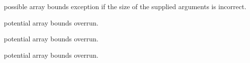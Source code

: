 
\begin{DoxyRefList}
\item[\label{bug__bug000001}%
\hypertarget{bug__bug000001}{}%
Global \hyperlink{group__api_gaf04b41252ebd1a3013b6bcb4dbbf3649}{Line\-Picking\-All\-Problems} (char $\ast$$\ast$, char $\ast$$\ast$)]possible array bounds exception if the size of the supplied arguments is incorrect.  
\item[\label{bug__bug000004}%
\hypertarget{bug__bug000004}{}%
Global \hyperlink{group__api_ga445ba2c007d60d789747cecbd5f874b9}{Line\-Picking\-C\-D\-F} (double $\ast$, double $\ast$, int $\ast$, int $\ast$, double $\ast$, int $\ast$, int $\ast$, char $\ast$$\ast$)]potential array bounds overrun.  
\item[\label{bug__bug000003}%
\hypertarget{bug__bug000003}{}%
Global \hyperlink{group__api_ga8feba9835984bd74f3d919f51389e573}{Line\-Picking\-P\-D\-F} (double $\ast$, double $\ast$, int $\ast$, int $\ast$, double $\ast$, int $\ast$, int $\ast$, char $\ast$$\ast$)]potential array bounds overrun.  
\item[\label{bug__bug000002}%
\hypertarget{bug__bug000002}{}%
Global \hyperlink{group__api_ga0aec0b2f87903f4bf4ad3011a99b3446}{Line\-Picking\-Support} (double $\ast$, int $\ast$, double $\ast$, int $\ast$, int $\ast$, char $\ast$$\ast$)]potential array bounds overrun. 
\end{DoxyRefList}